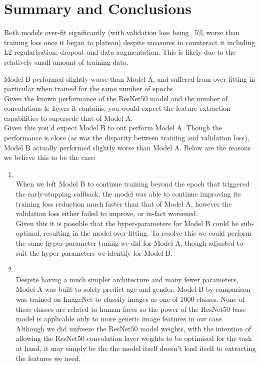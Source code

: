 \section{Summary and Conclusions}
Both models over-fit significantly (with validation loss being ~5\% worse than training loss once it began to plateau) despite measures to counteract it including L2 regularisation,
dropout and data augmentation. This is likely due to the relatively small amount of training data.

Model B performed slightly worse than Model A, and suffered from over-fitting in particular when trained for the same number of epochs.\\
Given the known performance of the ResNet50 model and the number of convolutions \& layers it contains, you would expect the feature extraction capabilities to supersede that of Model A.\\
Given this you'd expect Model B to out perform Model A.
Though the performance is close (as was the disparity between training and validation loss), Model B actually performed slightly worse than Model A.
Below are the reasons we believe this to be the case:
\begin{enumerate}
    \item {}\\
    When we left Model B to continue training beyond the epoch that triggered the early-stopping callback, the model was able to continue improving its training loss reduction much faster than that of Model A, however the validation loss either failed to improve, or in-fact worsened.\\
    Given this it is possible that the hyper-parameters for Model B could be sub-optimal, resulting in the model over-fitting.
    To resolve this we could perform the same hyper-parameter tuning we did for Model A, though adjusted to suit the hyper-parameters we identify for Model B.

    \item {}\\
    Despite having a much simpler architecture and many fewer parameters, Model A was built to solely predict age and gender. Model B by comparison was trained on ImageNet to classify images as one of 1000 classes. None of these classes are related to human faces so the power of the ResNet50 base model is applicable only to more generic image features in our case.\\
    Although we did unfreeze the ResNet50 model weights, with the intention of allowing the ResNet50 convolution layer weights to be optimised for the task at hand, it may simply be the the model itself doesn't lend itself to extracting the features we need.  
\end{enumerate}